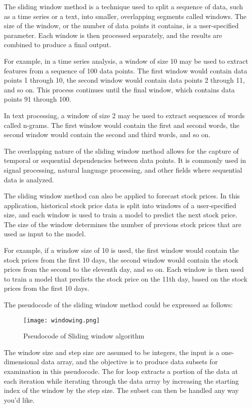\documentclass[a4paper]{article}
\begin{document}
The sliding window method is a technique used to split a sequence of data, such as a time series or a text, into smaller, overlapping segments called windows. The size of the window, or the number of data points it contains, is a user-specified parameter. Each window is then processed separately, and the results are combined to produce a final output.

For example, in a time series analysis, a window of size 10 may be used to extract features from a sequence of 100 data points. The first window would contain data points 1 through 10, the second window would contain data points 2 through 11, and so on. This process continues until the final window, which contains data points 91 through 100.

In text processing, a window of size 2 may be used to extract sequences of words called n-grams. The first window would contain the first and second words, the second window would contain the second and third words, and so on.

The overlapping nature of the sliding window method allows for the capture of temporal or sequential dependencies between data points. It is commonly used in signal processing, natural language processing, and other fields where sequential data is analyzed.

The sliding window method can also be applied to forecast stock prices. In this application, historical stock price data is split into windows of a user-specified size, and each window is used to train a model to predict the next stock price. The size of the window determines the number of previous stock prices that are used as input to the model.

For example, if a window size of 10 is used, the first window would contain the stock prices from the first 10 days, the second window would contain the stock prices from the second to the eleventh day, and so on. Each window is then used to train a model that predicts the stock price on the 11th day, based on the stock prices from the first 10 days.

The pseudocode of the sliding window method could be expressed as follows:

\begin{figure}[!h]
    \centering
    \texttt{[image: windowing.png]}
    \caption{Pseudocode of Sliding window algorithm}
    \label{fig:my_label}
\end{figure}

The window size and step size are assumed to be integers, the input is a one-dimensional data array, and the objective is to produce data subsets for examination in this pseudocode. The for loop extracts a portion of the data at each iteration while iterating through the data array by increasing the starting index of the window by the step size. The subset can then be handled any way you'd like.
\end{document}
